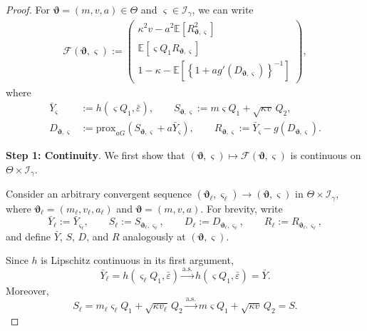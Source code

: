 \documentclass[10pt,a4paper]{amsart}
\newcommand{\as}{\overset{\mathrm{a.s.}}{\longrightarrow}}
\newcommand{\prox}{\mathrm{prox}}
\begin{document}
\begin{proof}
For $\bm\vartheta=(m,v,a)\in\Theta$ and $\varsigma\in\mathcal I_\gamma$, we can write
\begin{align}
\mathcal F(\bm\vartheta,\varsigma)
:=
\begin{pmatrix}
\kappa^2v
-
a^2\mathbb{E}\left[
R_{\bm\vartheta,\varsigma}^2
\right]
\\[1mm]
\mathbb{E}\left[
\varsigma Q_1R_{\bm\vartheta,\varsigma}
\right]
\\[1mm]
1-\kappa
-
\mathbb{E}\left[
\left\{
1+a g'(D_{\bm\vartheta,\varsigma})
\right\}^{-1}
\right]
\end{pmatrix},
\label{eq:SE-residual-map}
\end{align}
where
\begin{align}
\bar Y_{\varsigma}
&:=
h(\varsigma Q_1,\bar\varepsilon),
\qquad S_{\bm\vartheta,\varsigma}
:=
m\varsigma Q_1+\sqrt{\kappa v}\,Q_2,
\label{eq:SE-linear-varsigma}\\
D_{\bm\vartheta,\varsigma}
&:=
{\prox}_{aG}
\left(
S_{\bm\vartheta,\varsigma}
+a\bar Y_{\varsigma}
\right),
\qquad R_{\bm\vartheta,\varsigma}
:=
\bar Y_{\varsigma}
-
g(D_{\bm\vartheta,\varsigma}).
\label{eq:SE-residual-varsigma}
\end{align}

\textbf{Step 1: Continuity}.
We first show that $(\bm\vartheta,\varsigma)
\mapsto
\mathcal F(\bm\vartheta,\varsigma)$
is continuous on
$\Theta\times\mathcal I_\gamma$.

Consider an arbitrary convergent sequence $(\bm\vartheta_\ell,\varsigma_\ell)
\rightarrow
(\bm\vartheta,\varsigma)$ in $\Theta\times\mathcal I_\gamma,$
where $\bm\vartheta_\ell=(m_\ell,v_\ell,a_\ell)$ and $\bm\vartheta=(m,v,a).$
For brevity, write
\[
\bar Y_\ell
:=
\bar Y_{\varsigma_\ell},
\qquad
S_\ell
:=
S_{\bm\vartheta_\ell,\varsigma_\ell},
\qquad
D_\ell
:=
D_{\bm\vartheta_\ell,\varsigma_\ell},
\qquad
R_\ell
:=
R_{\bm\vartheta_\ell,\varsigma_\ell},
\]
and define
$\bar Y$, $S$, $D$, and $R$ analogously at
$(\bm\vartheta,\varsigma)$.

Since $h$ is Lipschitz continuous in its first argument,
\[
\bar Y_\ell
=h(\varsigma_\ell Q_1,\bar\varepsilon)
\as
h(\varsigma Q_1,\bar\varepsilon)
=\bar Y.
\]
Moreover,
\[
S_\ell
=m_\ell\varsigma_\ell Q_1+\sqrt{\kappa v_\ell}\,Q_2
\as
m\varsigma Q_1+\sqrt{\kappa v}\,Q_2=
S.
\]


\end{proof}
\end{document}
